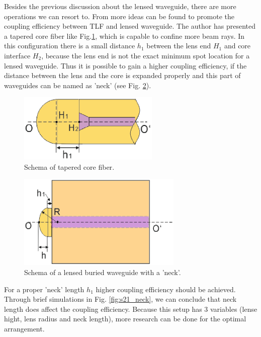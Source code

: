 Besides the previous discussion about the lensed waveguide, there are more operations we can resort to. From \cite{integrated_coupling_between_LD_SMF} more ideas can be found to promote the coupling efficiency between TLF and lensed waveguide. The author has presented a tapered core fiber like Fig.\ref{fig:tapered_core_fiber}, which is capable to confine more beam rays. In this configuration there is a small distance $h_{1}$ between the lens end $H_{1}$ and core interface $H_{2}$, because the lens end is not the exact minimum spot location for a lensed waveguide. Thus it is possible to gain a higher coupling efficiency, if the distance between the lens and the core is expanded properly and this part of waveguides can be named as 'neck' (see Fig. \ref{fig:lensed_waveguide_neck}).\\ 

\begin{figure}[!ht]
\centering
\includegraphics[width=0.6\textwidth]{bilder/tapered_core_fiber}
\caption {Schema of tapered core fiber\cite{integrated_coupling_between_LD_SMF}.}
\label{fig:tapered_core_fiber}
\end{figure}
\begin{figure}[!ht]
\centering
\includegraphics[width=0.7\textwidth]{bilder/lensed_waveguide_neck}
\caption {Schema of a lensed buried waveguide with a 'neck'.}
\label{fig:lensed_waveguide_neck}
\end{figure}
For a proper 'neck' length $h_{1}$ higher coupling efficiency should be achieved. Through brief simulations in Fig. \ref{fig:s21_neck}, we can conclude that neck length does affect the coupling efficiency. Because this setup has 3 variables (lense hight, lens radius and neck length), more research can be done for the optimal arrangement.\\

